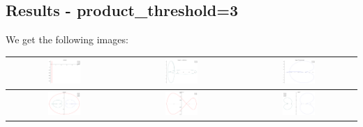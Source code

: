 \documentclass[a4paper,10pt]{article}
\begin{document}
 \subsection{Results - product\_threshold=3}
 We get the following images:
 \begin{table}[!ht]
 \begin{tabular}{|c|c|c|}
  \hline
  \includegraphics[width=0.3\textwidth]{PT_3_z1.png} &
  \includegraphics[width=0.3\textwidth]{PT_3_C1z1.png} &
  \includegraphics[width=0.3\textwidth]{PT_3_C2z1.png} \\ \hline
  \includegraphics[width=0.3\textwidth]{PT_3_z2.png} &
  \includegraphics[width=0.3\textwidth]{PT_3_zed_C0.png} &
  \includegraphics[width=0.3\textwidth]{PT_3_zed.png} \\ \hline
 \end{tabular}
 \end{table}
\end{document}
